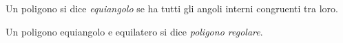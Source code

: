 \begin{definizione}
Un poligono si dice \emph{equiangolo} se ha tutti gli angoli interni 
congruenti tra loro.
\end{definizione}

\begin{definizione}
Un poligono equiangolo e equilatero si dice \emph{poligono regolare}.
\end{definizione}




\begin{comment}

Sappiamo che nel corso degli studi o nell'attività lavorativa possono 
presentarsi problemi di diversa natura: di tipo economico, 
scientifico, sociale; possono riguardare insiemi numerici o figure 
geometriche. La matematica ci può aiutare a risolvere i problemi 
quando essi possono essere tradotti in ``forma matematica'', quando 
cioè è possibile trascrivere in simboli le relazioni che intercorrono 
tra le grandezze presenti nel problema e quando si può costruire, 
tramite queste relazioni, un modello matematico che ci permetta di 
raggiungere la soluzione al quesito.

Affronteremo problemi di tipo algebrico o geometrico, che potranno 
essere formalizzati attraverso equazioni di secondo grado in una sola 
incognita.
Teniamo presente, prima di buttarci nella risoluzione del problema, 
alcuni passi che ci aiuteranno a costruire il modello matematico:
\begin{itemize*}
\item la lettura ``attenta'' del testo al fine di individuare 
l'ambiente del problema, le parole chiave, i dati e le informazioni 
implicite, l'obiettivo;
\item la scelta della grandezza incognita del problema, la 
descrizione dell'insieme in cui si ricerca il suo valore, le 
condizioni che devono essere soddisfatte dall'incognita;
\item la traduzione in ``forma matematica'' delle relazioni che 
intercorrono tra i dati e l'obiettivo, cioè l'individuazione del 
modello matematico (equazione risolvente).
\end{itemize*}
\begin{center}
 
\end{center}


\end{comment}
